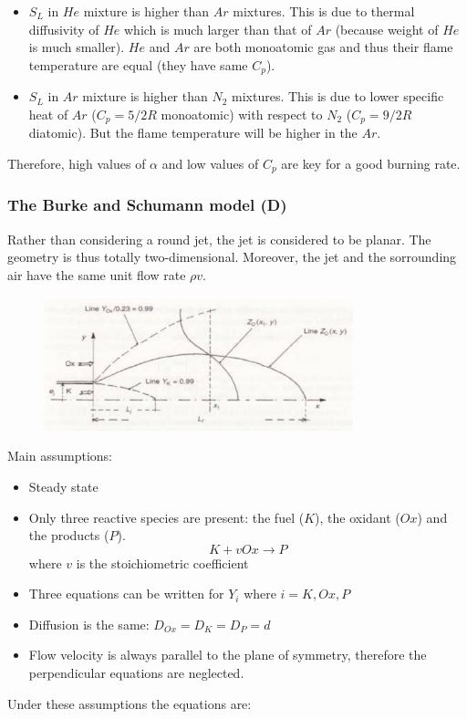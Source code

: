 \documentclass[12pt]{article}
\begin{document}
\begin{itemize}
    \item $S_{L}$ in $He$ mixture is higher than $Ar$ mixtures. This is due to thermal diffusivity of $He$ which is much larger than that of $Ar$ (because weight of $He$ is much smaller). $He$ and $Ar$ are both monoatomic gas and thus their flame temperature are equal (they have same $C_{p}$).
    \item $S_{L}$ in $Ar$ mixture is higher than $N_{2}$ mixtures. This is due to lower specific heat of $Ar$ ($C_{p}=5/2R$ monoatomic) with respect to $N_{2}$ ($C_{p}=9/2R$ diatomic). But the flame temperature will be higher in the $Ar$.
\end{itemize}

Therefore, high values of $\alpha$ and low values of $C_{p}$ are key for a good burning rate.

\subsubsection{The Burke and Schumann model (D)}

Rather than considering a round jet, the jet is considered to be planar. The geometry is thus totally two-dimensional. Moreover, the jet and the sorrounding air have the same unit flow rate $\rho v$.

\begin{figure}[h!]
\centering
\includegraphics[width=0.8\textwidth]{figures/burke.png}
\end{figure}

Main assumptions:
\begin{itemize}
    \item Steady state
    \item Only three reactive species are present: the fuel ($K$), the oxidant ($Ox$) and the products ($P$).
    \begin{equation}
        K + vOx \rightarrow P
    \end{equation}
    where $v$ is the stoichiometric coefficient
    \item Three equations can be written for $Y_{i}$ where $i=K,Ox,P$
    \item Diffusion is the same: $D_{Ox}=D_{K}=D_{P}=d$
    \item Flow velocity is always parallel to the plane of symmetry, therefore the perpendicular equations are neglected.
\end{itemize}
Under these assumptions the equations are:
\end{document}
